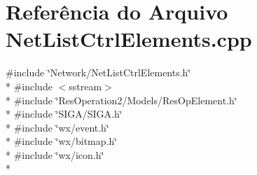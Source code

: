 \section{Referência do Arquivo Net\+List\+Ctrl\+Elements.\+cpp}
\label{_net_list_ctrl_elements_8cpp}
{\ttfamily \#include \char`\"{}Network/\+Net\+List\+Ctrl\+Elements.\+h\char`\"{}}\\*
{\ttfamily \#include $<$sstream$>$}\\*
{\ttfamily \#include \char`\"{}Res\+Operation2/\+Models/\+Res\+Op\+Element.\+h\char`\"{}}\\*
{\ttfamily \#include \char`\"{}S\+I\+G\+A/\+S\+I\+G\+A.\+h\char`\"{}}\\*
{\ttfamily \#include \char`\"{}wx/event.\+h\char`\"{}}\\*
{\ttfamily \#include \char`\"{}wx/bitmap.\+h\char`\"{}}\\*
{\ttfamily \#include \char`\"{}wx/icon.\+h\char`\"{}}\\*
